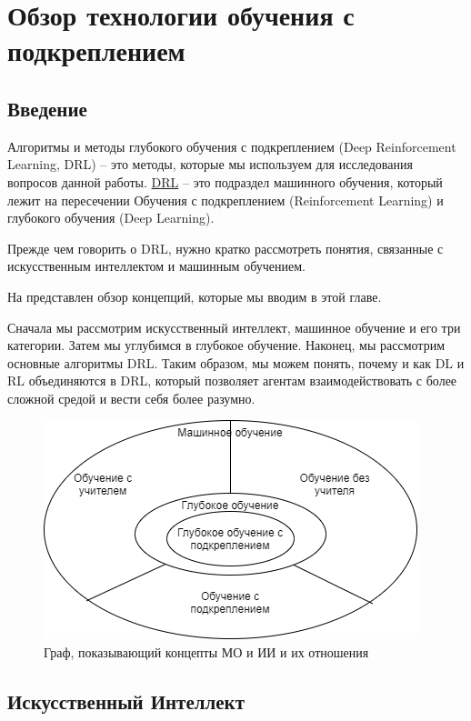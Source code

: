 \chapter{Обзор технологии обучения с подкреплением} \label{ch1}

\section{Введение} \label{ch1:intro}

Алгоритмы и методы глубокого обучения с подкреплением (Deep Reinforcement Learning, DRL) – это методы, которые мы используем для исследования вопросов данной работы. \hyperref[acr:drl]{DRL} – это подраздел машинного обучения, который лежит на пересечении Обучения с подкреплением (Reinforcement Learning) и глубокого обучения (Deep Learning).

Прежде чем говорить о DRL, нужно кратко рассмотреть понятия, связанные с искусственным интеллектом и машинным обучением.

На  представлен обзор концепций, которые мы вводим в этой главе. 

Сначала мы рассмотрим искусственный интеллект, машинное обучение и его три категории. Затем мы углубимся в глубокое обучение. Наконец, мы рассмотрим основные алгоритмы DRL.
Таким образом, мы можем понять, почему и как DL и RL объединяются в DRL, который позволяет агентам взаимодействовать с более сложной средой и вести себя более разумно.

\begin{figure}[ht!] 
	\center
	\includegraphics [scale=0.80] {my_folder/images/ch1/ML-and-AI-concepts.png}
	\caption{Граф, показывающий концепты МО и ИИ и их отношения} 
	\label{fig:ch1-ML-and-AI-concepts}  
\end{figure}

\section{Искусственный Интеллект} \label{ch1:ai}

